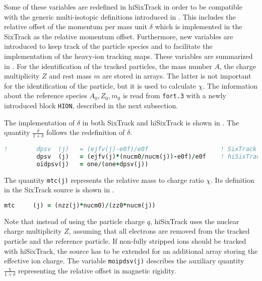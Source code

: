 \begin{appendices}
Some of these variables are redefined in hiSixTrack in order to be compatible with the generic multi-isotopic definitions introduced in . This includes the relative offset of the momentum per mass unit $\delta$ which is implemented in the SixTrack as the relative momentum offset. Furthermore, new variables are introduced to keep track of the particle species and to facilitate the implementation of the heavy-ion tracking maps. These variables are summarized in . For the identification of the tracked particles, the mass number $A$, the charge multiplicity $Z$ and rest mass $m$ are stored in arrays. The latter is not important for the identification of the particle, but it is used to calculate $\chi$. The information about the reference species $A_0,Z_0,m_0$ is read from \lstinline{fort.3} with a newly introduced block \lstinline{HION}, described in the next subsection. 

The implementation of $\delta$ in both SixTrack and hiSixTrack is shown in . The quantity $ \frac{\delta}{1+\delta}$ follows the redefinition of $\delta$.

\vspace{0.5cm}
\begin{minipage}{\linewidth}
\begin{lstlisting}[language=Fortran,caption=Definition of $\delta$ in SixTrack and hiSixTrack.,label=lst_delta]
!        dpsv  (j)   = (ejfv(j)-e0f)/e0f                    ! SixTrack
         dpsv  (j)   = (ejfv(j)*(nucm0/nucm(j))-e0f)/e0f    ! hiSixTrack
         oidpsv(j)   = one/(one+dpsv(j))
\end{lstlisting}
\end{minipage}


The quantity \lstinline{mtc(j)} represents the relative mass to charge ratio $\chi$. Its definition in the SixTrack source is shown in . 

\vspace{0.5cm}
\begin{minipage}{\linewidth}
\begin{lstlisting}[language=Fortran,caption=Definition of $\chi$ in hiSixTrack.,label=lst_chi]
        mtc     (j) = (nzz(j)*nucm0)/(zz0*nucm(j)) 
\end{lstlisting}
\end{minipage}

Note that instead of using the particle charge $q$, hiSixTrack uses the nuclear charge multiplicity $Z$, assuming that all electrons are removed from the tracked particle and the reference particle. If non-fully stripped ions should be tracked with hiSixTrack, the source has to be extended for an additional array storing the effective ion charge. The variable \lstinline{moipdsv(j)} describes the auxiliary quantity $\frac{\chi}{1+\delta}$ representing the relative offset in magnetic rigidity.


\end{appendices}
